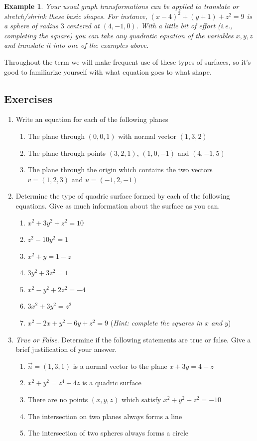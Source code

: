 \documentclass[12pt]{article}
\numberwithin{equation}{subsection}
\numberwithin{figure}{subsection}
\theoremstyle{note}
\newtheorem{example}[subsection]{Example}
\begin{document}
{\begin{example}
Your usual graph transformations can be applied to translate or stretch/shrink these basic shapes. For instance, $(x-4)^2+(y+1)+z^2=9$ is a sphere of radius $3$ centered at $(4,-1,0)$. With a little bit of effort (i.e., completing the square) you can take \textit{any} quadratic equation of the variables $x,y,z$ and translate it into one of the examples above.

\end{example}

Throughout the term we will make frequent use of these types of surfaces, so it's good to familiarize yourself with what equation goes to what shape. 

\subsection{Exercises}

\begin{enumerate}[label=\arabic*.]
	\item Write an equation for each of the following planes
	\begin{enumerate}
		\item The plane through $(0,0,1)$ with normal vector $(1,3,2)$
		\item The plane through points $(3,2,1)$, $(1,0,-1)$ and $(4,-1,5)$
		\item The plane through the origin which contains the two vectors $v=(1,2,3)$ and $u=(-1,2,-1)$
	\end{enumerate}	
	
	
	\item Determine the type of quadric surface formed by each of the following equations. Give as much information about the surface as you can.
	\begin{enumerate}
		\item $x^2+3y^2+z^2=10$
		\item $z^2-10y^2=1$
		\item $x^2+y=1-z$
		\item $3y^2+3z^2=1$
		\item $x^2-y^2+2z^2=-4$
		\item $3x^2+3y^2=z^2$
		\item $x^2-2x+y^2-6y+z^2=9$ \quad (\textit{Hint: complete the squares in $x$ and $y$})
	\end{enumerate}

	\item \textit{True or False}. Determine if the following statements are true or false. Give a brief justification of your answer.
	\begin{enumerate}
		\item  $\vec{n}=(1,3,1)$ is a normal vector to the plane $x+3y=4-z$\
		\item $x^2+y^2=z^4+4z$ is a quadric surface
		\item There are no points $(x,y,z)$ which satisfy $x^2+y^2+z^2=-10$
		\item The intersection on two planes always forms a line
		\item The intersection of two spheres always forms a circle
	\end{enumerate}
	

\end{enumerate}}
\end{document}

